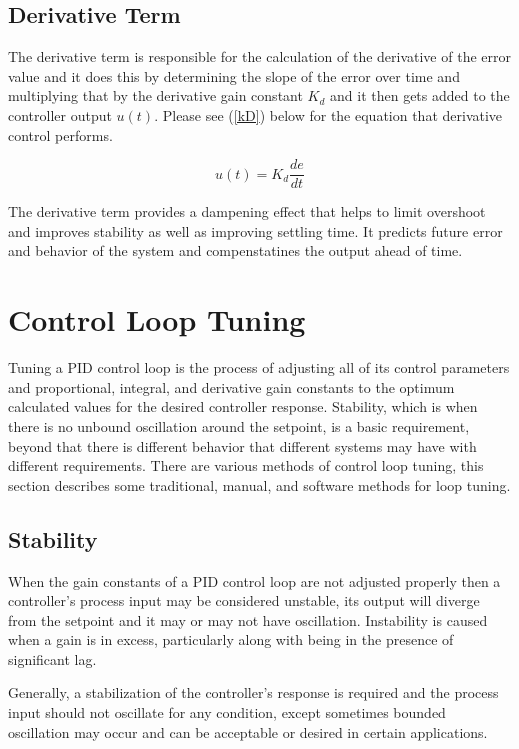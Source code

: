 \documentclass[10pt,conference]{IEEEtran}
\begin{document}
\subsection{Derivative Term}

The derivative term is responsible for the calculation of the derivative of the error value
and it does this by determining the slope of the error over time and multiplying that by
the derivative gain constant \(K_d\) and it then gets added to the controller output \(u(t)\).
Please see (\ref{kD}) below for the equation that derivative control performs.

\begin{equation}
    \displaystyle {u(t)=K_d\frac{de}{dt}}\label{kD}
\end{equation}

The derivative term provides a dampening effect that helps to limit overshoot and improves
stability as well as improving settling time. It predicts future error and behavior of the
system and compenstatines the output ahead of time.

\section{Control Loop Tuning}

Tuning a PID control loop is the process of adjusting all of its control parameters and
proportional, integral, and derivative gain constants to the optimum calculated values
for the desired controller response. Stability, which is when there is no unbound
oscillation around the setpoint, is a basic requirement, beyond that there is different
behavior that different systems may have with different requirements. There are various
methods of control loop tuning, this section describes some traditional, manual, and
software methods for loop tuning.

\subsection{Stability}

When the gain constants of a PID control loop are not adjusted properly then a controller's
process input may be considered unstable, its output will diverge from the setpoint and it
may or may not have oscillation. Instability is caused when a gain is in excess, particularly
along with being in the presence of significant lag.

Generally, a stabilization of the controller's response is required and the process input
should not oscillate for any condition, except sometimes bounded oscillation may occur and
can be acceptable or desired in certain applications.
\end{document}

